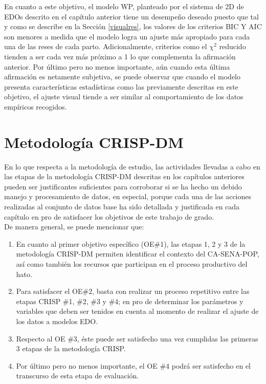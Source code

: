 En cuanto a este objetivo, el modelo WP, planteado por el sistema de 2D de EDOs descrito en el capítulo anterior tiene un desempeño deseado puesto que tal y como se describe en la Sección \ref{visualres}, los valores de los criterios BIC Y AIC son menores a medida que el modelo logra un ajuste más apropiado para cada una de las reses de cada parto. Adicionalmente, criterios como el $\chi^{2}$ reducido tienden a ser cada vez más próximo a 1 lo que complementa la afirmación anterior. Por último pero no menos importante, aún cuando esta última afirmación es netamente subjetiva, se puede observar que  cuando el modelo presenta características estadísticas como las previamente descritas en este objetivo, el ajuste visual tiende a ser similar al comportamiento de los datos empíricos recogidos.




\section{Metodología CRISP-DM}

En lo que respecta a la metodología de estudio, las actividades llevadas a cabo en las etapas de la metodología CRISP-DM descritas en los capítulos anteriores pueden ser justificantes suficientes para corroborar si se ha hecho un debido manejo y procesamiento de datos, en especial, porque cada una de las acciones realizadas al conjunto de datos base ha sido detallada y justificada en cada capítulo en pro de satisfacer los objetivos de este trabajo de grado.\\

De manera general, se puede mencionar que:
\begin{enumerate}
    \item En cuanto al primer objetivo específico (OE\#1), las etapas 1, 2 y 3 de la metodología CRISP-DM permiten identificar el contexto del CA-SENA-POP, así como también los recursos que participan en el proceso productivo del hato.
    \item Para satisfacer el OE\#2, basta con realizar un proceso repetitivo entre las etapas CRISP \#1, \#2, \#3 y \#4; en pro de determinar los parámetros y variables que deben ser tenidos en cuenta al momento de realizar el ajuste de los datos a modelos EDO.
    \item Respecto al OE \#3, éste puede ser satisfecho una vez cumplidas las primeras 3 etapas de la metodología CRISP.
    \item Por último pero no menos importante, el OE \#4 podrá ser satisfecho en el transcurso de esta etapa de evaluación.
\end{enumerate}
 

